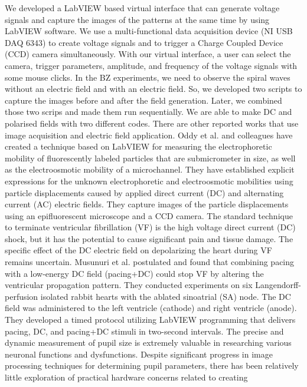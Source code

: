 \documentclass[journal=jacsat,manuscript=article]{achemso}
\begin{document}
We developed a LabVIEW based virtual interface that can generate
voltage signals and capture the images of the patterns at the same
time by using LabVIEW software.  We use a multi-functional data
acquisition device (NI USB DAQ 6343) to create voltage signals and to
trigger a Charge Coupled Device (CCD) camera simultaneously. With our
virtual interface, a user can select the camera, trigger parameters,
amplitude, and frequency of the voltage signals with some mouse
clicks. In the BZ experiments, we need to observe the spiral waves
without an electric field and with an electric field. So, we developed
two scripts to capture the images before and after the field
generation. Later, we combined those two scrips and made them run
sequentially. We are able to make DC and polarised fields with two
different codes.  There are other reported works that use image
acquisition and electric field application. \cite{oddy2004method} Oddy
et al. and colleagues have created a technique based on LabVIEW for
measuring the electrophoretic mobility of fluorescently labeled
particles that are submicrometer in size, as well as the
electroosmotic mobility of a microchannel. They have established
explicit expressions for the unknown electrophoretic and
electroosmotic mobilities using particle displacements caused by
applied direct current (DC) and alternating current (AC) electric
fields. They capture images of the particle displacements using an
epifluorescent microscope and a CCD camera.  The standard technique to
terminate ventricular fibrillation (VF) is the high voltage direct
current (DC) shock, but it has the potential to cause significant pain
and tissue damage. The specific effect of the DC electric field on
depolarizing the heart during VF remains
uncertain. \cite{musunuri2009ventricular} Musunuri et al. postulated
and found that combining pacing with a low-energy DC field (pacing+DC)
could stop VF by altering the ventricular propagation pattern. They
conducted experiments on six Langendorff-perfusion isolated rabbit
hearts with the ablated sinoatrial (SA) node. The DC field was
administered to the left ventricle (cathode) and right ventricle
(anode). They developed a timed protocol utilizing LabVIEW programming
that delivers pacing, DC, and pacing+DC stimuli in two-second
intervals.  The precise and dynamic measurement of pupil size is
extremely valuable in researching various neuronal functions and
dysfunctions. Despite significant progress in image processing
techniques for determining pupil parameters, there has been relatively
little exploration of practical hardware concerns related to creating
\end{document}

